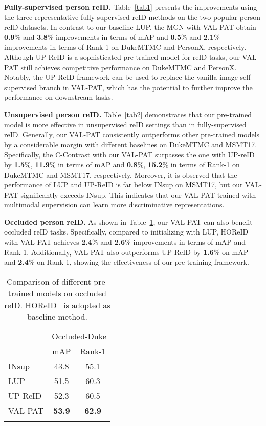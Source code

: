 \documentclass[final]{cvpr}
\begin{document}
\noindent
\textbf{Fully-supervised person reID.}
Table~\ref{tab1} presents the improvements using the three representative fully-supervised reID methods on the two popular person reID datasets.
In contrast to our baseline LUP, the MGN with VAL-PAT obtain \textbf{0.9}\% and \textbf{3.8}\% improvements in terms of mAP and \textbf{0.5}\% and \textbf{2.1}\% improvements in terms of Rank-1 on DukeMTMC and PersonX, respectively.
Although UP-ReID is a sophisticated pre-trained model for reID tasks, our VAL-PAT still achieves competitive performance on DukeMTMC and PersonX.
Notably, the UP-ReID framework can be used to replace the vanilla image self-supervised branch in VAL-PAT, which has the potential to further improve the performance on downstream tasks.


\noindent
\textbf{Unsupervised person reID.}
Table~\ref{tab2} demonstrates that our pre-trained model is more effective in unsupervised reID settings than in fully-supervised reID.
Generally, our VAL-PAT consistently outperforms other pre-trained models by a considerable margin with different baselines on DukeMTMC and MSMT17.
Specifically, the C-Contrast with our VAL-PAT surpasses the one with UP-reID by \textbf{1.5}\%, \textbf{11.9}\% in terms of mAP and \textbf{0.8}\%, \textbf{15.2}\% in terms of Rank-1 on DukeMTMC and MSMT17, respectively.
Moreover, it is observed that the performance of LUP and UP-ReID is far below INsup on MSMT17, but our VAL-PAT significantly exceeds INsup.
This indicates that our VAL-PAT trained with multimodal supervision can learn more discriminative representations.

\noindent
\textbf{Occluded person reID.}
As shown in Table~\ref{tab:occ-reid}, our VAL-PAT can also benefit occluded reID tasks.
Specifically, compared to initializing with LUP, HOReID with VAL-PAT achieves \textbf{2.4}\% and \textbf{2.6}\% improvements in terms of mAP and Rank-1.
Additionally, VAL-PAT also outperforms UP-ReID by \textbf{1.6}\% on mAP and \textbf{2.4}\% on Rank-1, showing the effectiveness of our pre-training framework.
\begin{table}[h!]
\small
\vspace{-3mm}
\centering
\setlength{\tabcolsep}{5.4mm}
    \begin{tabular}{l|cc}
    \shline
    \centering
    \multirow{2}{*}{pre-train} & \multicolumn{2}{c}{Occluded-Duke}  \\
    \cline{2-3} & mAP & Rank-1  \\
    \hline
    \centering
    INsup     & 43.8 &  55.1 \\
    \centering
\centering
    LUP  & 51.5 & 60.3  \\
    \centering
    UP-ReID  & 52.3 & 60.5  \\
    \centering
    VAL-PAT & \textbf{53.9} & \textbf{62.9} \\
    \shline
    \end{tabular}
    \vspace{-2mm}
    \caption{Comparison of different pre-trained models on occluded reID.
    HOReID~\cite{wang2020high} is adopted as baseline method.}
    \label{tab:occ-reid}
    \vspace{-2mm}
\end{table}
\end{document}
